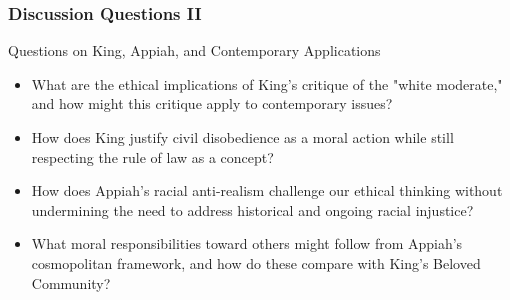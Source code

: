 \documentclass{beamer}
\begin{document}
	\begin{frame}
		\frametitle{Discussion Questions II}
		
		\begin{exampleblock}{Questions on King, Appiah, and Contemporary Applications}
			\begin{itemize}
				\item What are the ethical implications of King's critique of the "white moderate," and how might this critique apply to contemporary issues?
				\item How does King justify civil disobedience as a moral action while still respecting the rule of law as a concept?
				\item How does Appiah's racial anti-realism challenge our ethical thinking without undermining the need to address historical and ongoing racial injustice?
				\item What moral responsibilities toward others might follow from Appiah's cosmopolitan framework, and how do these compare with King's Beloved Community?
			\end{itemize}
		\end{exampleblock}
		
	\end{frame}
	
\end{document}
